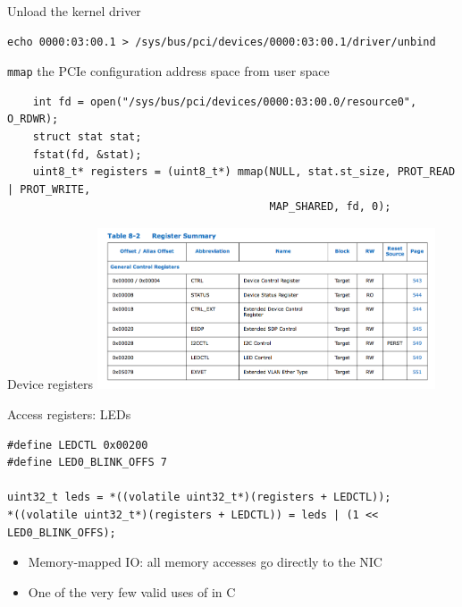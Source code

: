 \documentclass[NET,english,aspectratio=169,notitleframe]{tumbeamer}
\begin{document}
\begin{frame}[fragile=singleslide]{Unload the kernel driver}
\begin{verbatim}
echo 0000:03:00.1 > /sys/bus/pci/devices/0000:03:00.1/driver/unbind
\end{verbatim}
\end{frame}

\begin{frame}[fragile=singleslide]{\texttt{mmap} the PCIe configuration address space from user space}
\begin{verbatim}
	int fd = open("/sys/bus/pci/devices/0000:03:00.0/resource0", O_RDWR);
	struct stat stat;
	fstat(fd, &stat);
	uint8_t* registers = (uint8_t*) mmap(NULL, stat.st_size, PROT_READ | PROT_WRITE,
	                                     MAP_SHARED, fd, 0);
\end{verbatim}
\end{frame}

\begin{frame}{Device registers}
\centering\includegraphics[width=0.75\textwidth]{pics/registers}
\end{frame}

\begin{frame}[fragile=singleslide]{Access registers: LEDs}
\begin{verbatim}
#define LEDCTL 0x00200
#define LED0_BLINK_OFFS 7

uint32_t leds = *((volatile uint32_t*)(registers + LEDCTL));
*((volatile uint32_t*)(registers + LEDCTL)) = leds | (1 << LED0_BLINK_OFFS);
\end{verbatim}
\begin{itemize}
\item Memory-mapped IO: all memory accesses go directly to the NIC
\item One of the very few valid uses of  in C
\end{itemize}
\end{frame}
\end{document}
